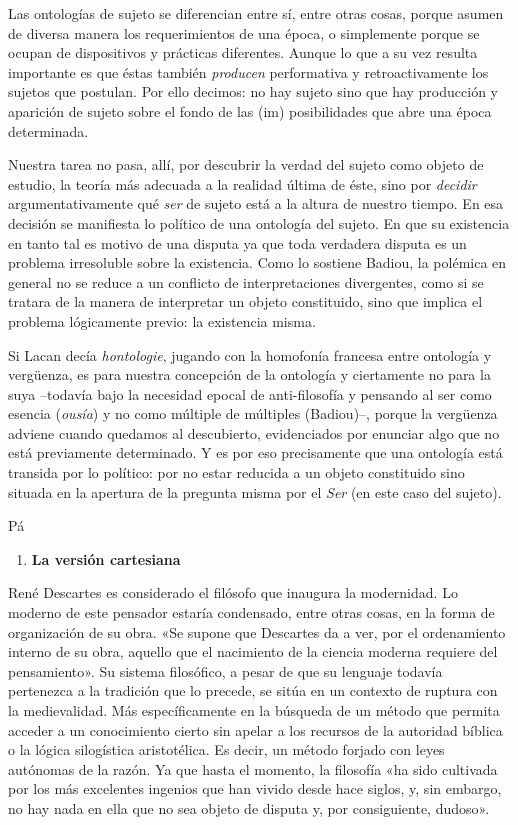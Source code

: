 Las ontologías de sujeto se diferencian entre sí, entre otras cosas, porque asumen de diversa manera los requerimientos de una época, o simplemente porque se ocupan de dispositivos y prácticas diferentes. Aunque lo que a su vez resulta importante es que éstas también \emph{producen} performativa y retroactivamente los sujetos que postulan. Por ello decimos: no hay sujeto sino que hay producción y aparición de sujeto sobre el fondo de las (im) posibilidades que abre una época determinada.

Nuestra tarea no pasa, allí, por descubrir la verdad del sujeto como objeto de estudio, la teoría más adecuada a la realidad última de éste, sino por \emph{decidir} argumentativamente qué \emph{ser} de sujeto está a la altura de nuestro tiempo. En esa decisión se manifiesta lo político de una ontología del sujeto. En que su existencia en tanto tal es motivo de una disputa ya que toda verdadera disputa es un problema irresoluble sobre la existencia. Como lo sostiene Badiou, la polémica en general no se reduce a un conflicto de interpretaciones divergentes, como si se tratara de la manera de interpretar un objeto constituido, sino que implica el problema lógicamente previo: la existencia misma.

Si Lacan decía \emph{hontologie}, jugando con la homofonía francesa entre ontología y vergüenza, es para nuestra concepción de la ontología y ciertamente no para la suya --todavía bajo la necesidad epocal de anti-filosofía y pensando al ser como esencia (\emph{ousía}) y no como múltiple de múltiples (Badiou)--, porque la vergüenza adviene cuando quedamos al descubierto, evidenciados por enunciar algo que no está previamente determinado. Y es por eso precisamente que una ontología está transida por lo político: por no estar reducida a un objeto constituido sino situada en la apertura de la pregunta misma por el \emph{Ser }(en este caso del sujeto).

Pá

\begin{enumerate}
\def\labelenumi{\arabic{enumi}.}
\item
  \textbf{La versión cartesiana}
\end{enumerate}

René Descartes es considerado el filósofo que inaugura la modernidad. Lo moderno de este pensador estaría condensado, entre otras cosas, en la forma de organización de su obra. «Se supone que Descartes da a ver, por el ordenamiento interno de su obra, aquello que el nacimiento de la ciencia moderna requiere del pensamiento». Su sistema filosófico, a pesar de que su lenguaje todavía pertenezca a la tradición que lo precede, se sitúa en un contexto de ruptura con la medievalidad. Más específicamente en la búsqueda de un método que permita acceder a un conocimiento cierto sin apelar a los recursos de la autoridad bíblica o la lógica silogística aristotélica. Es decir, un método forjado con leyes autónomas de la razón. Ya que hasta el momento, la filosofía «ha sido cultivada por los más excelentes ingenios que han vivido desde hace siglos, y, sin embargo, no hay nada en ella que no sea objeto de disputa y, por consiguiente, dudoso».

